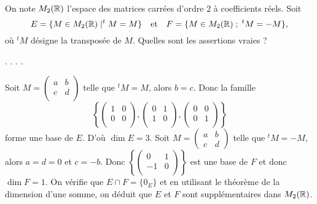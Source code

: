 \begin{question}
On note $ M_2(\mathbb{R})$ l'espace des matrices carrées d'ordre $2$ à coefficients réels. Soit 
$$E= \{M \in M_2(\mathbb{R})\mid ^tM = M\} \quad \mbox{et}\quad F= \{M \in M_2(\mathbb{R}) \; ; \;  ^tM = -M\},$$
où $^tM$  désigne la transposée de $M$. Quelles sont les assertions vraies ?
\begin{answers}  
.
.
.
.
\end{answers}
\begin{explanations} Soit $M=\left(\begin{array}{rc}
a&b\\ c&d\\ \end{array}\right)$ telle que $^tM = M$, alors $b=c$. Donc la famille
$$\left\{\left(\begin{array}{rc}
1&0\\0&0\\ 
\end{array}\right),\left(\begin{array}{rc}
0&1\\1&0\\ 
\end{array}\right),\left(\begin{array}{rc}
0&0\\0&1\\ \end{array}\right)\right\}$$
forme une base de $E$. D'où $\dim E = 3$.
\vskip0mm
Soit $M=\left(\begin{array}{rc}a&b\\c&d\end{array}\right)$ telle que $ ^tM = -M$, alors $a=d=0$ et $c=-b$. Donc $\left\{\left(\begin{array}{rc}
0&1\\-1&0\\ \end{array}\right)\right\}$ est une base de $F$ et donc $\dim F=1$.
\vskip0mm
On vérifie que $E\cap F=\{0_E\}$ et en utilisant le théorème de la dimension d'une somme, on déduit que $E$ et $F$ sont supplémentaires dans $ M_2(\mathbb{R})$.
\end{explanations}
\end{question}


